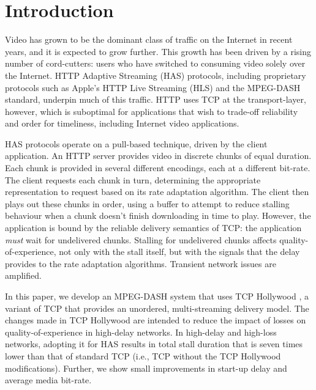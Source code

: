 \section{Introduction}


Video has grown to be the dominant class of traffic on the Internet in recent
years, and it is expected to grow further. This growth has been driven by a rising number
of cord-cutters: users who have switched to consuming video solely over the Internet. HTTP
Adaptive Streaming (HAS) protocols, including proprietary protocols such as Apple's HTTP Live
Streaming (HLS) and the MPEG-DASH standard, underpin much of this traffic.  HTTP uses TCP
at the transport-layer, however, which is suboptimal for applications that wish to trade-off
reliability and order for timeliness, including Internet video applications.


HAS protocols operate on a pull-based technique, driven by the client application. An HTTP
server provides video in discrete chunks of equal duration. Each chunk is provided in several 
different encodings, each at a different bit-rate. The client requests each chunk in turn, 
determining the
appropriate representation to request based on its rate adaptation algorithm. The client
then plays out these chunks in order, using a buffer to attempt to reduce stalling
behaviour when a chunk doesn't finish downloading in time to play. However, the application 
is bound by the reliable delivery
semantics of TCP: the application \emph{must} wait for undelivered chunks. Stalling for
undelivered chunks affects quality-of-experience, not only with the stall itself, but with
the signals that the delay provides to the rate adaptation algorithms. Transient network
issues are amplified.


In this paper, we develop an MPEG-DASH system that uses TCP Hollywood
\cite{mcquistin2016tcp,mcquistin2016tcp2}, a variant of TCP
that provides an unordered, multi-streaming delivery model. The changes made in
TCP Hollywood are intended to reduce the impact of
losses on quality-of-experience in high-delay networks. In high-delay and high-loss networks, 
adopting it for HAS results in total stall duration that is seven times lower than that of 
standard TCP (i.e., TCP without the TCP Hollywood modifications).
Further, we show small improvements in start-up delay and average media bit-rate.

